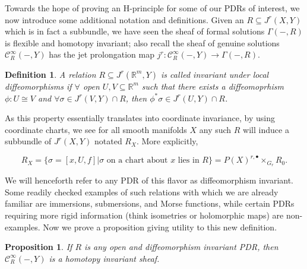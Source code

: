 \documentclass{article}
\newtheorem{proposition}[theorem]{Proposition}
\newtheorem{definition}[theorem]{Definition}
\newtheorem{proposed work}[theorem]{Proposed Work}
\theoremstyle{definition}
\begin{document}
Towards the hope of proving an H-principle for some of our PDRs of interest, we now introduce some additional notation and definitions. Given an $R \subseteq J^r(X,Y)$ which is in fact a subbundle, we have seen the sheaf of formal solutions $\Gamma (-,R)$ is flexible and homotopy invariant; also recall the sheaf of genuine solutions $\mathcal{C}^\infty_R(-,Y)$ has the jet prolongation map $j^r:\mathcal{C}^\infty_R(-,Y) \to \Gamma (-,R)$.

\begin{definition}
A relation $R \subseteq J^r(\mathbb{R}^m,Y)$ is called invariant under local diffeomorphisms if $\forall$ open $U,V \subseteq \mathbb{R}^m$ such that there exists a diffeomoprhism $\phi:U \cong V$ and $\forall \sigma \in J^r(V,Y) \cap R$, then $\phi^*\sigma \in J^r(U,Y) \cap R$.
\end{definition}

As this property essentially translates into coordinate invariance, by using coordinate charts, we see for all smooth manifolds $X$ any such $R$ will induce a subbundle of $J^r(X,Y)$ notated $R_X$. More explicitly,

\begin{equation*}
R_X = \{\sigma = [x,U,f]|\sigma \text{ on a chart about $x$ lies in } R\} = P(X)^{r,\bullet} \times_{G_r} R_0.
\end{equation*}

We will henceforth refer to any PDR of this flavor as diffeomorphism invariant. Some readily checked examples of such relations with which we are already familiar are immersions, submersions, and Morse functions, while certain PDRs requiring more rigid information (think isometries or holomorphic maps) are non-examples. Now we prove a proposition giving utility to this new definition.

\begin{proposition}
If $R$ is any open and diffeomorphism invariant PDR, then $\mathcal{C}^\infty_R(-,Y)$ is a homotopy invariant sheaf.
\end{proposition}
\end{document}
